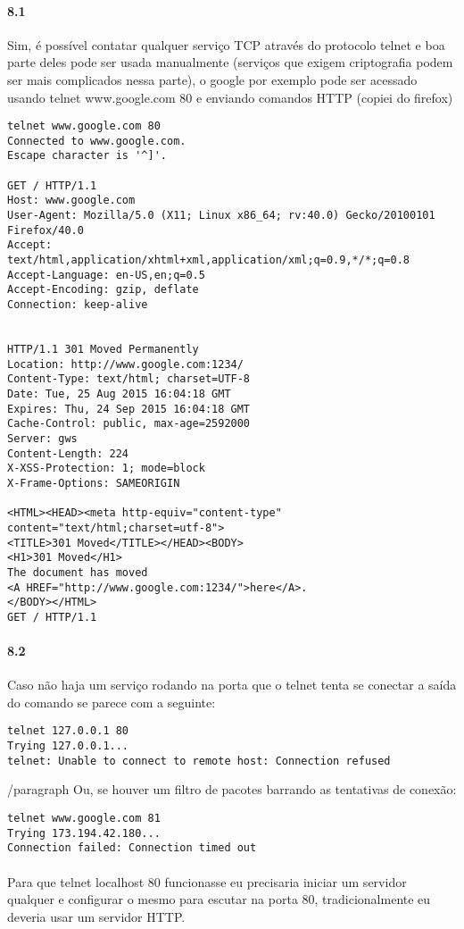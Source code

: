 \documentclass{article}
\begin{document}
\paragraph{8.1} Sim, é possível contatar qualquer serviço TCP através do protocolo telnet e boa parte
deles pode ser usada manualmente (serviços que exigem criptografia podem ser mais complicados nessa
parte), o google por exemplo pode ser acessado usando telnet www.google.com 80 e enviando comandos
HTTP (copiei do firefox)
\begin{verbatim}
telnet www.google.com 80
Connected to www.google.com.
Escape character is '^]'.

GET / HTTP/1.1
Host: www.google.com
User-Agent: Mozilla/5.0 (X11; Linux x86_64; rv:40.0) Gecko/20100101 Firefox/40.0
Accept: text/html,application/xhtml+xml,application/xml;q=0.9,*/*;q=0.8
Accept-Language: en-US,en;q=0.5
Accept-Encoding: gzip, deflate
Connection: keep-alive


HTTP/1.1 301 Moved Permanently
Location: http://www.google.com:1234/
Content-Type: text/html; charset=UTF-8
Date: Tue, 25 Aug 2015 16:04:18 GMT
Expires: Thu, 24 Sep 2015 16:04:18 GMT
Cache-Control: public, max-age=2592000
Server: gws
Content-Length: 224
X-XSS-Protection: 1; mode=block
X-Frame-Options: SAMEORIGIN

<HTML><HEAD><meta http-equiv="content-type" content="text/html;charset=utf-8">
<TITLE>301 Moved</TITLE></HEAD><BODY>
<H1>301 Moved</H1>
The document has moved
<A HREF="http://www.google.com:1234/">here</A>.
</BODY></HTML>
GET / HTTP/1.1

\end {verbatim}
\paragraph{8.2} Caso não haja um serviço rodando na porta que o telnet tenta se conectar a
saída do comando se parece com a seguinte:
\begin{verbatim}
telnet 127.0.0.1 80
Trying 127.0.0.1...
telnet: Unable to connect to remote host: Connection refused
\end{verbatim}
/paragraph{} Ou, se houver um filtro de pacotes barrando as tentativas de conexão:
\begin{verbatim}
telnet www.google.com 81                                      
Trying 173.194.42.180...
Connection failed: Connection timed out
\end{verbatim}
\paragraph{} Para que telnet localhost 80 funcionasse eu precisaria iniciar um servidor qualquer
e configurar o mesmo para escutar na porta 80, tradicionalmente eu deveria usar um servidor HTTP.
\end{document}
